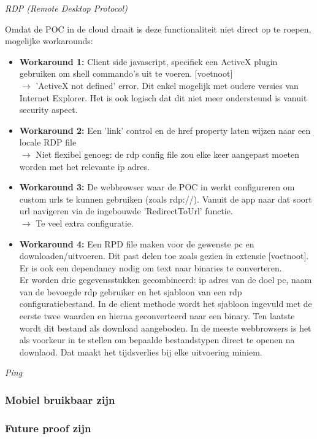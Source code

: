\textit{RDP (Remote Desktop Protocol)}

Omdat de POC in de cloud draait is deze functionaliteit niet direct op te roepen, mogelijke workarounds:
\begin{itemize}
    \item \textbf{Workaround 1:} Client side javascript, specifiek een ActiveX plugin gebruiken om shell commando's uit te voeren. [voetnoot]\\
    $\rightarrow$ 'ActiveX not defined' error. Dit enkel mogelijk met oudere versies van Internet Explorer. Het is ook logisch dat dit niet meer ondersteund is vanuit security aspect.
    \item \textbf{Workaround 2:} Een 'link' control en de href property laten wijzen naar een locale RDP file\\
    $\rightarrow$ Niet flexibel genoeg: de rdp config file zou elke keer aangepast moeten worden met het relevante ip adres.
    \item \textbf{Workaround 3:} De webbrowser waar de POC in werkt configureren om custom urls te kunnen gebruiken (zoals rdp://). Vanuit de app naar dat soort url navigeren via de ingebouwde 'RedirectToUrl' functie.\\
    $\rightarrow$ Te veel extra configuratie.
    \item \textbf{Workaround 4:} Een RPD file maken voor de gewenste pc en downloaden/uitvoeren. Dit past delen toe zoals gezien in extensie [voetnoot]. Er is ook een dependancy nodig om text naar binaries te converteren.\\
    Er worden drie gegevensstukken gecombineerd: ip adres van de doel pc, naam van de bevoegde rdp gebruiker en het sjabloon van een rdp configuratiebestand. In de client methode wordt het sjabloon ingevuld met de eerste twee waarden en hierna geconverteerd naar een binary. Ten laatste wordt dit bestand als download aangeboden. In de meeste webbrowsers is het als voorkeur in te stellen om bepaalde bestandstypen direct te openen na downlaod. Dat maakt het tijdsverlies bij elke uitvoering miniem.
\end{itemize}

\textit{Ping}


\subsubsection{Mobiel bruikbaar zijn}
\subsubsection{Future proof zijn}
